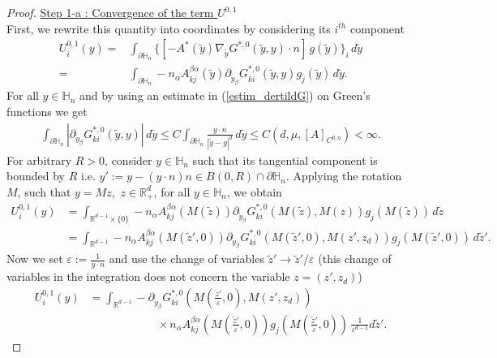 \documentclass[11pt, reqno]{amsart}
\theoremstyle{definition}
\theoremstyle{remark}
\numberwithin{equation}{section}
\begin{document}
\begin{proof}[Proof]
		
		\noindent 
		\underline{Step 1-a : Convergence of the term $U^{0,1}$} \\
			\noindent 	First, we rewrite this quantity into coordinates by considering its $i^{th}$ component
		\begin{align*}
			U^{0,1}_i(y)= &\int_{\partial\mathbb{H}_n} \{[ -A^*(\tilde{y}) \nabla_{\!\tilde{y}}G^{*,0} \left(\tilde{y},y \right)\cdot n] \,g(\tilde{y})\}_i\,d\tilde{y} \\
			=& \int_{\partial\mathbb{H}_n} 
			-n_\alpha A^{\beta\alpha}_{kj}(\tilde{y})\partial_{\tilde{y}_\beta} G^{*,0}_{ki} \left(\tilde{y},y \right)g_j(\tilde{y})\,d\tilde{y} .
		\end{align*}
		For all $y\in \mathbb{H}_n$ and by using an estimate in (\ref{estim_dertildG}) on  Green's functions we get 
		\begin{align*}
			\int_{\partial\mathbb{H}_n}  |\partial_{ \tilde{y}_\beta} G^{*,0} _{ki} \left(\tilde{y},y \right) |\,d\tilde{y}\leq 	C \int_{\partial\mathbb{H}_n}  \frac{y\cdot n}{|\tilde{y}-y|^{d}}\,d\tilde{y} \leq C(d,\mu, [A]_{C^{0,\eta}})< \infty.
		\end{align*}		
		For arbitrary $R>0$,  consider $y\in\mathbb{H}_n $  such that its tangential component is bounded by $R$ 
		i.e. $y':=y-(y\cdot n)n \in B(0,R) \cap\partial\mathbb{H}_n$.
		Applying the rotation $M$, such that  $y=M z,$ $z\in  \mathbb{R}^d_+$, for all $y\in\mathbb{H}_n $, we obtain 
		\begin{align*}
			U^{0,1}_i(y) &= \int_{\mathbb{R}^{d-1}\times\{0\}} -n_\alpha A^{\beta\alpha}_{kj}(M(\tilde{z})) \partial_{ \tilde{y}_\beta}G^{*,0}_{ki} \left(M(\tilde{z}),M(z) \right)g_j(M(\tilde{z}))\,d\tilde{z}  \\
			&=\int_{\mathbb{R}^{d-1}} -n_\alpha A^{\beta\alpha}_{kj}(M(\tilde{z}',0)) \partial_{ \tilde{y}_\beta}G^{*,0} _{ki} (M(\tilde{z}',0), M(z',z_d)) g_j(M(\tilde{z}',0))\,d\tilde{z}'.  
		\end{align*}
		Now we set $\varepsilon := \frac{1}{y\cdot n}$
		and use  the change of variables $\tilde{z}'\rightarrow \tilde{z}'/\varepsilon $ (this change of variables in the integration does not concern the variable $z=(z',z_d)$)
		\begin{align*}
			U^{0,1}_i(y)
			&=\int_{\mathbb{R}^{d-1}} -\partial_{\tilde{y}_\beta} G^{*,0}_{ki}\left(M\left(\frac{\tilde{z}'}{\varepsilon },0\right), M\left( z',z_d  \right)\right) \\
			&\qquad \qquad\qquad \times n_\alpha A^{\beta\alpha}_{kj}\left(M\left(\frac{\tilde{z}'}{\varepsilon },0\right)\right)g_j\left(M\left(\frac{\tilde{z}'}{\varepsilon },0\right)\right)\,\frac{1}{\varepsilon^{d-1} } d\tilde{z}'.

\end{align*}
\end{proof}
\end{document}
